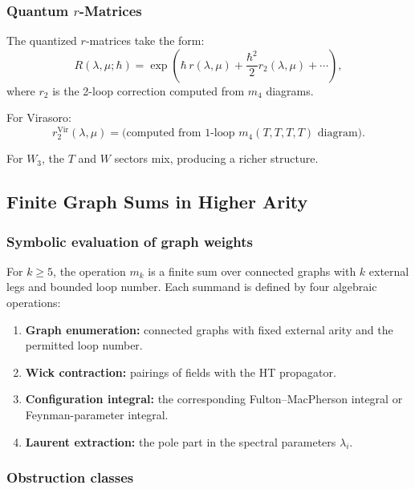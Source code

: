 \subsubsection{Quantum $r$-Matrices}

The quantized $r$-matrices take the form:
\begin{equation}
R(\lambda,\mu; \hbar) = \exp\left( \hbar \, r(\lambda,\mu) + \frac{\hbar^2}{2} r_2(\lambda,\mu) + \cdots \right),
\end{equation}
where $r_2$ is the 2-loop correction computed from $m_4$ diagrams.

For Virasoro:
\begin{equation}
r_2^{\text{Vir}}(\lambda,\mu) = \text{(computed from 1-loop } m_4(T,T,T,T) \text{ diagram)}.
\end{equation}

For $W_3$, the $T$ and $W$ sectors mix, producing a richer structure.

\subsection{Finite Graph Sums in Higher Arity}

\subsubsection{Symbolic evaluation of graph weights}

For $k\geq5$, the operation $m_k$ is a finite sum over connected
graphs with $k$ external legs and bounded loop number. Each summand is
defined by four algebraic operations:
\begin{enumerate}
\item \textbf{Graph enumeration:} connected graphs with fixed external
arity and the permitted loop number.
\item \textbf{Wick contraction:} pairings of fields with the HT
propagator.
\item \textbf{Configuration integral:} the corresponding
Fulton--MacPherson integral or Feynman-parameter integral.
\item \textbf{Laurent extraction:} the pole part in the spectral
parameters $\lambda_i$.
\end{enumerate}

\subsubsection{Obstruction classes}

